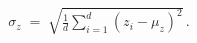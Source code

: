 \documentclass[preview]{standalone}
\begin{document}
\begin{align*}
\sigma_z \;=\;\sqrt{\frac{1}{d}\sum_{i=1}^{d}(z_i - \mu_z)^2}\,.
\end{align*}
\end{document}
